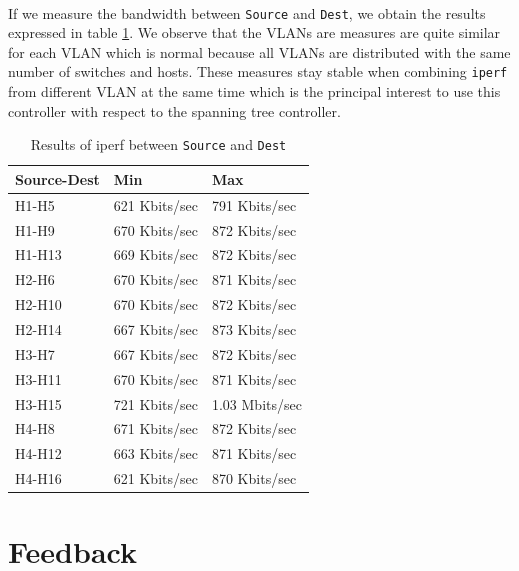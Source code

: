 \documentclass[a4paper, 11pt, oneside]{article}
\begin{document}
\paragraph{}If we measure the bandwidth between \texttt{Source} and \texttt{Dest}, we obtain the results expressed in table \ref{table:VLANs_bw}. We observe that the VLANs are measures are quite similar for each VLAN which is normal because all VLANs are distributed with the same number of switches and hosts. These measures stay stable when combining \texttt{iperf} from different VLAN at the same time which is the principal interest to use this controller with respect to the spanning tree controller.
\begin{table}[H]
    \centering
    \begin{tabular}{|l|l|l|}
    \hline
    \textbf{Source-Dest} & \textbf{Min}  & \textbf{Max}   \\ \hline
    H1-H5                & 621 Kbits/sec & 791 Kbits/sec  \\ \hline
    H1-H9                & 670 Kbits/sec & 872 Kbits/sec  \\ \hline
    H1-H13               & 669 Kbits/sec & 872 Kbits/sec  \\ \hline
    H2-H6                & 670 Kbits/sec & 871 Kbits/sec  \\ \hline
    H2-H10               & 670 Kbits/sec & 872 Kbits/sec  \\ \hline
    H2-H14               & 667 Kbits/sec & 873 Kbits/sec  \\ \hline
    H3-H7                & 667 Kbits/sec & 872 Kbits/sec  \\ \hline
    H3-H11               & 670 Kbits/sec & 871 Kbits/sec  \\ \hline
    H3-H15               & 721 Kbits/sec & 1.03 Mbits/sec \\ \hline
    H4-H8                & 671 Kbits/sec & 872 Kbits/sec  \\ \hline
    H4-H12               & 663 Kbits/sec & 871 Kbits/sec  \\ \hline
    H4-H16               & 621 Kbits/sec & 870 Kbits/sec  \\ \hline
    \end{tabular}
    \caption{Results of iperf between \texttt{Source} and \texttt{Dest}}
    \label{table:VLANs_bw}
    \end{table}


\section{Feedback} \label{sec:feedback}
\end{document}
